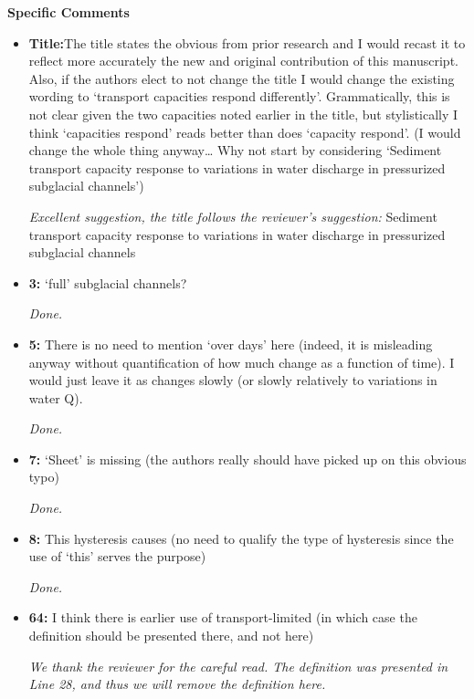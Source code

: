 \documentclass[11pt]{article}
\begin{document}
\textbf{Specific Comments}

\begin{itemize}
\item \textbf{Title:}The title states the obvious from prior research and I would recast it to
  reflect more accurately the new and original contribution of this
  manuscript. Also, if the authors elect to not change the title I would change
  the existing wording to ‘transport capacities respond differently’.
  Grammatically, this is not clear given the two capacities noted earlier in the
  title, but stylistically I think ‘capacities respond’ reads better than does
  ‘capacity respond’. (I would change the whole thing anyway… Why not start
  by considering ‘Sediment transport capacity response to variations in water
  discharge in pressurized subglacial channels’)

  \textit{Excellent suggestion, the title follows the reviewer's suggestion:} Sediment transport capacity response to variations in water discharge in pressurized subglacial channels
  
\item \textbf{3:} ‘full’ subglacial channels?

  \textit{Done.}
  
\item \textbf{5:} There is no need to mention ‘over days’ here (indeed, it is misleading
  anyway without quantification of how much change as a function of time).
  I would just leave it as changes slowly (or slowly relatively to variations in
  water Q).

  \textit{Done.}

\item \textbf{7:} ‘Sheet’ is missing (the authors really should have picked up on this obvious
  typo)

  \textit{Done.}

  
\item \textbf{8:} This hysteresis causes (no need to qualify the type of hysteresis since the
  use of ‘this’ serves the purpose)

  \textit{Done.}

  
\item \textbf{64:} I think there is earlier use of transport-limited (in which case the definition
  should be presented there, and not here)

  \textit{We thank the reviewer for the careful read. The definition was presented in Line 28, and thus we will remove the definition here.}



\end{itemize}
\end{document}
